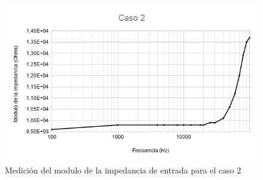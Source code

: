 \begin{figure}[H]
\begin{centering}
\includegraphics[scale=0.5]{../Ex1/iA/Resources1a/zinpm2_med}
\par\end{centering}
\caption{Medición del modulo de la impedancia de entrada para el caso 2}

\end{figure}

